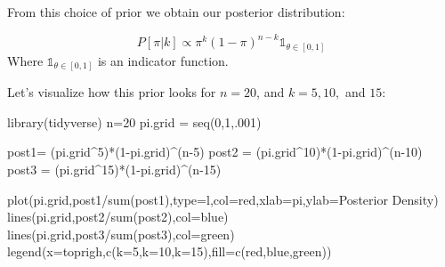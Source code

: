 \documentclass[
]{article}
\newenvironment{Shaded}{\begin{snugshade}}{\end{snugshade}}
\newcommand{\AttributeTok}[1]{\textcolor[rgb]{0.77,0.63,0.00}{#1}}
\newcommand{\DecValTok}[1]{\textcolor[rgb]{0.00,0.00,0.81}{#1}}
\newcommand{\FunctionTok}[1]{\textcolor[rgb]{0.00,0.00,0.00}{#1}}
\newcommand{\NormalTok}[1]{#1}
\newcommand{\OtherTok}[1]{\textcolor[rgb]{0.56,0.35,0.01}{#1}}
\newcommand{\SpecialCharTok}[1]{\textcolor[rgb]{0.00,0.00,0.00}{#1}}
\newcommand{\StringTok}[1]{\textcolor[rgb]{0.31,0.60,0.02}{#1}}
\begin{document}
From this choice of prior we obtain our posterior distribution:

\[
P[\pi|k] \propto \pi^k (1-\pi)^{n-k} \mathbb{1}_{\theta \in [0,1]}
\] Where \(\mathbb{1}_{\theta \in [0,1]}\) is an indicator function.

Let's visualize how this prior looks for \(n=20\), and \(k=5,10,\) and
\(15\):

\begin{Shaded}
\begin{Highlighting}[]
\FunctionTok{library}\NormalTok{(tidyverse)}
\NormalTok{n}\OtherTok{=}\DecValTok{20}
\NormalTok{pi.grid }\OtherTok{=} \FunctionTok{seq}\NormalTok{(}\DecValTok{0}\NormalTok{,}\DecValTok{1}\NormalTok{,.}\DecValTok{001}\NormalTok{)}

\NormalTok{post1}\OtherTok{=}\NormalTok{ (pi.grid}\SpecialCharTok{\^{}}\DecValTok{5}\NormalTok{)}\SpecialCharTok{*}\NormalTok{(}\DecValTok{1}\SpecialCharTok{{-}}\NormalTok{pi.grid)}\SpecialCharTok{\^{}}\NormalTok{(n}\DecValTok{{-}5}\NormalTok{)}
\NormalTok{post2 }\OtherTok{=}\NormalTok{ (pi.grid}\SpecialCharTok{\^{}}\DecValTok{10}\NormalTok{)}\SpecialCharTok{*}\NormalTok{(}\DecValTok{1}\SpecialCharTok{{-}}\NormalTok{pi.grid)}\SpecialCharTok{\^{}}\NormalTok{(n}\DecValTok{{-}10}\NormalTok{)}
\NormalTok{post3 }\OtherTok{=}\NormalTok{ (pi.grid}\SpecialCharTok{\^{}}\DecValTok{15}\NormalTok{)}\SpecialCharTok{*}\NormalTok{(}\DecValTok{1}\SpecialCharTok{{-}}\NormalTok{pi.grid)}\SpecialCharTok{\^{}}\NormalTok{(n}\DecValTok{{-}15}\NormalTok{)}


\FunctionTok{plot}\NormalTok{(pi.grid,post1}\SpecialCharTok{/}\FunctionTok{sum}\NormalTok{(post1),}\AttributeTok{type=}\StringTok{\textquotesingle{}l\textquotesingle{}}\NormalTok{,}\AttributeTok{col=}\StringTok{\textquotesingle{}red\textquotesingle{}}\NormalTok{,}\AttributeTok{xlab=}\StringTok{\textquotesingle{}pi\textquotesingle{}}\NormalTok{,}\AttributeTok{ylab=}\StringTok{\textquotesingle{}Posterior Density\textquotesingle{}}\NormalTok{)}
\FunctionTok{lines}\NormalTok{(pi.grid,post2}\SpecialCharTok{/}\FunctionTok{sum}\NormalTok{(post2),}\AttributeTok{col=}\StringTok{\textquotesingle{}blue\textquotesingle{}}\NormalTok{)}
\FunctionTok{lines}\NormalTok{(pi.grid,post3}\SpecialCharTok{/}\FunctionTok{sum}\NormalTok{(post3),}\AttributeTok{col=}\StringTok{\textquotesingle{}green\textquotesingle{}}\NormalTok{)}
\FunctionTok{legend}\NormalTok{(}\AttributeTok{x=}\StringTok{\textquotesingle{}toprigh\textquotesingle{}}\NormalTok{,}\FunctionTok{c}\NormalTok{(}\StringTok{\textquotesingle{}k=5\textquotesingle{}}\NormalTok{,}\StringTok{\textquotesingle{}k=10\textquotesingle{}}\NormalTok{,}\StringTok{\textquotesingle{}k=15\textquotesingle{}}\NormalTok{),}\AttributeTok{fill=}\FunctionTok{c}\NormalTok{(}\StringTok{\textquotesingle{}red\textquotesingle{}}\NormalTok{,}\StringTok{\textquotesingle{}blue\textquotesingle{}}\NormalTok{,}\StringTok{\textquotesingle{}green\textquotesingle{}}\NormalTok{))}
\end{Highlighting}
\end{Shaded}
\end{document}
